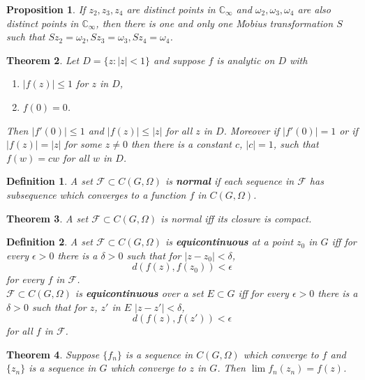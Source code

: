 \documentclass[answers, a4paper, 12pt]{exam}
\newtheorem{theorem}{Theorem}[section]
\newtheorem{proposition}[theorem]{Proposition}
\newtheorem{definition}{Definition}
\newcommand{\C}{\mathbb{C}}
\begin{document}
\begin{proposition}
    If $z_2, z_3, z_4$ are distinct points in $\C_{\infty}$ and $\omega_2, \omega_3, \omega_4$ are also distinct points in $\C_{\infty}$, then there is one and only one M$\ddot{o}$bius transformation $S$ such that $Sz_2=\omega_2, Sz_3=\omega_3, Sz_4=\omega_4$.
\end{proposition}

\begin{theorem}
    Let $D=\{z: |z| < 1\}$ and suppose $f$ is analytic on $D$ with
    \begin{enumerate}
        \item $|f(z)|\leq 1$ for $z$ in $D$,
        \item $f(0)=0$.
    \end{enumerate}
    Then $|f'(0)|\leq 1$ and $|f(z)|\leq|z|$ for all $z$ in $D$. Moreover if $|f'(0)|=1$ or if $|f(z)|=|z|$ for some $z\neq 0$ then there is a constant $c$, $|c|=1$, such that $f(w)=cw$ for all $w$ in $D$.
\end{theorem}

\begin{definition}
    A set $\mathcal{F}\subset C(G,\Omega)$ is \textbf{normal} if each sequence in $\mathcal{F}$ has subsequence which converges to a function $f$ in $C(G,\Omega)$.
\end{definition}

\begin{theorem}
    A set $\mathcal{F}\subset C(G,\Omega)$ is normal iff its closure is compact.
\end{theorem}

\begin{definition}
    A set $\mathcal{F}\subset C(G,\Omega)$ is \textbf{equicontinuous} at a point $z_0$ in $G$ iff for every $\epsilon>0$ there is a $\delta>0$ such that for $|z-z_0|<\delta$,
    $$d(f(z),f(z_0))<\epsilon$$
    for every $f$ in $\mathcal{F}$.\\
    $\mathcal{F}\subset C(G,\Omega)$ is \textbf{equicontinuous} over a set $E\subset G$ iff for every $\epsilon>0$ there is a $\delta>0$ such that for $z$, $z'$ in $E$ $|z-z'|<\delta$,
    $$d(f(z),f(z'))<\epsilon$$
    for all $f$ in $\mathcal{F}$.
\end{definition}

\begin{theorem}
    Suppose $\{f_n\}$ is a sequence in $C(G,\Omega)$ which converge to $f$ and $\{z_n\}$ is a sequence in $G$ which converge to $z$ in $G$. Then $\lim{f_n(z_n)}=f(z)$.
\end{theorem}
\end{document}
